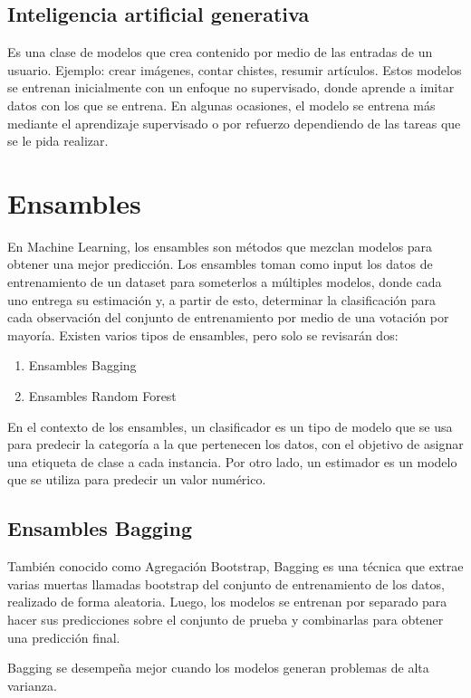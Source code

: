 \documentclass[a4paper, 12pt]{book}
\begin{document}
\subsection{Inteligencia artificial generativa}
Es una clase de modelos que crea contenido por medio de las entradas de un usuario. Ejemplo: crear imágenes, contar chistes, resumir artículos. Estos modelos se entrenan inicialmente con un enfoque no supervisado, donde aprende a imitar datos con los que se entrena. En algunas ocasiones, el modelo se entrena más mediante el aprendizaje supervisado o por refuerzo dependiendo de las tareas que se le pida realizar.

\section{Ensambles}
En Machine Learning, los ensambles son métodos que mezclan modelos para obtener una mejor predicción. Los ensambles toman como input los datos de entrenamiento de un dataset para someterlos a múltiples modelos, donde cada uno entrega su estimación y, a partir de esto, determinar la clasificación para cada observación del conjunto de entrenamiento por medio de una votación por mayoría. Existen varios tipos de ensambles, pero solo se revisarán dos:
\begin{enumerate}
	\item Ensambles Bagging
	\item Ensambles Random Forest
\end{enumerate}
En el contexto de los ensambles, un clasificador es un tipo de modelo que se usa para predecir la categoría a la que pertenecen los datos, con el objetivo de asignar una etiqueta de clase a cada instancia. Por otro lado, un estimador es un modelo que se utiliza para predecir un valor numérico.

\subsection{Ensambles Bagging}
También conocido como Agregación Bootstrap, Bagging es una técnica que extrae varias muertas llamadas bootstrap del conjunto de entrenamiento de los datos, realizado de forma aleatoria. Luego, los modelos se entrenan por separado para hacer sus predicciones sobre el conjunto de prueba y combinarlas para obtener una predicción final.

Bagging se desempeña mejor cuando los modelos generan problemas de alta varianza.
\end{document}
